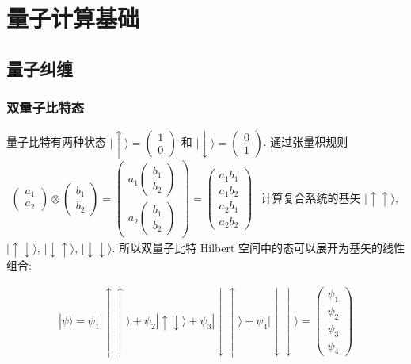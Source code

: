 \documentclass[../../main.tex]{subfiles}
\begin{document}
\section{量子计算基础}
\subsection{量子纠缠}
\subsubsection{双量子比特态}
量子比特有两种状态 $|\uparrow\rangle = \begin{pmatrix}
    1 \\ 0
\end{pmatrix}$ 和 $|\downarrow\rangle = \begin{pmatrix}
    0 \\ 1
\end{pmatrix}$. 通过张量积规则 $\begin{aligned}
    \begin{pmatrix}
        a_{1} \\ a_{2}
    \end{pmatrix}\otimes \begin{pmatrix}
        b_{1} \\ b_{2}
    \end{pmatrix} = \begin{pmatrix}
        a_{1}\begin{pmatrix}
            b_{1} \\ b_{2}
        \end{pmatrix} \\ a_{2}\begin{pmatrix}
            b_{1} \\ b_{2}
        \end{pmatrix}
    \end{pmatrix} = \begin{pmatrix}
        a_{1}b_{1} \\ a_{1}b_{2} \\ a_{2}b_{1} \\ a_{2}b_{2}
    \end{pmatrix}
\end{aligned}$ 
计算复合系统的基矢 $|\uparrow\uparrow\rangle$, 
$|\uparrow\downarrow\rangle$, $|\downarrow\uparrow\rangle$, $|\downarrow\downarrow\rangle$. 所以双量子比特 Hilbert 空间中的态可以展开为基矢的线性组合:

\begin{align*}
    |\psi\rangle = \psi_{1}|\uparrow\uparrow\rangle + \psi_{2}|\uparrow\downarrow\rangle + \psi_{3}|\downarrow\uparrow\rangle + \psi_{4}|\downarrow\downarrow\rangle = \begin{pmatrix}
        \psi_{1} \\ \psi_{2} \\ \psi_{3} \\ \psi_{4}
    \end{pmatrix}
\end{align*}
\end{document}
